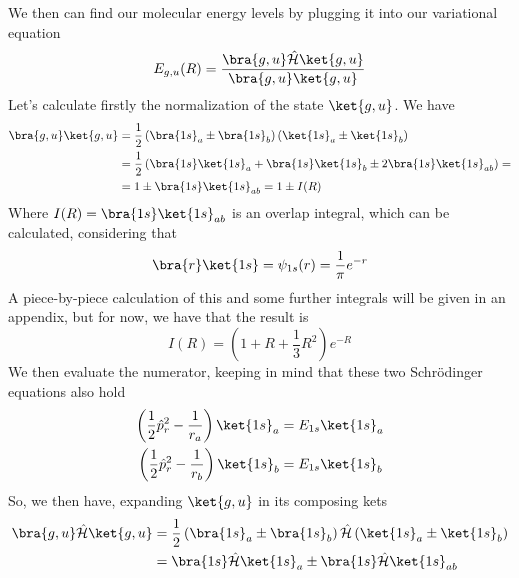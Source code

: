 \documentclass[a4paper, 11pt]{book}
\newcommand{\1}{\opr{\mathds{1}}}
\newcommand{\ham}{\mathcal{H}}
\newcommand{\opr}[1]{\hat{#1}}
\theoremstyle{plain}
\begin{document}
	We then can find our molecular energy levels by plugging it into our variational equation
	\begin{equation*}
		E_{g,u}(R)=\frac{\bra{g,u}\opr{\ham}\ket{g,u}}{\bra{g,u}\ket{g,u}}
	\end{equation*}
	Let's calculate firstly the normalization of the state $\ket{g,u}$. We have
	\begin{equation}
		\begin{aligned}
			\bra{g,u}\ket{g,u}&=\frac{1}{2}\left( \bra{1s}_a\pm\bra{1s}_b \right)\left( \ket{1s}_a\pm\ket{1s}_b \right)\\
			&=\frac{1}{2}\left( \bra{1s}\ket{1s}_a+\bra{1s}\ket{1s}_b\pm2\bra{1s}\ket{1s}_{ab} \right)=\\
			&=1\pm\bra{1s}\ket{1s}_{ab}=1\pm I(R)
		\end{aligned}
		\label{eq:normalizationguh2plus}
	\end{equation}
	Where $I(R)=\bra{1s}\ket{1s}_{ab}$ is an overlap integral, which can be calculated, considering that
	\begin{equation*}
		\bra{r}\ket{1s}=\psi_{1s}(r)=\frac{1}{\pi}e^{-r}
	\end{equation*}
	A piece-by-piece calculation of this and some further integrals will be given in an appendix, but for now, we have that the result is
	\begin{equation*}
		I(R)=\left( 1+R+\frac{1}{3}R^2 \right)e^{-R}
	\end{equation*}
	We then evaluate the numerator, keeping in mind that these two Schrödinger equations also hold
	\begin{equation*}
		\begin{aligned}
			\left( \frac{1}{2}\opr{p}^2_r-\frac{1}{r_a} \right)\ket{1s}_a&=E_{1s}\ket{1s}_a\\
			\left( \frac{1}{2}\opr{p}^2_r-\frac{1}{r_b} \right)\ket{1s}_b&=E_{1s}\ket{1s}_b
		\end{aligned}
	\end{equation*}
	So, we then have, expanding $\ket{g,u}$ in its composing kets
	\begin{equation}
		\begin{aligned}
			\bra{g,u}\opr{\ham}\ket{g,u}&=\frac{1}{2}\left( \bra{1s}_a\pm\bra{1s}_b \right)\opr{\ham}\left( \ket{1s}_a\pm\ket{1s}_b \right)\\
			&=\bra{1s}\opr{\ham}\ket{1s}_a\pm\bra{1s}\opr{\ham}\ket{1s}_{ab}
		\end{aligned}
		\label{eq:numeratorvariationalh2plus}
	\end{equation}
\end{document}
